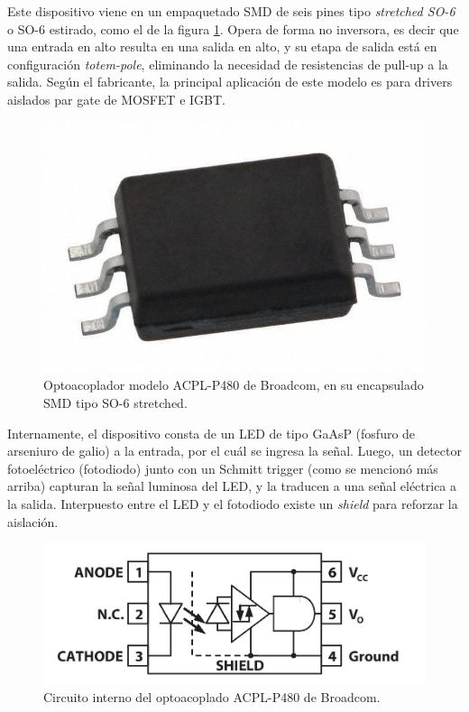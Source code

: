 Este dispositivo viene en un empaquetado SMD de seis pines tipo \textit{stretched SO-6} o SO-6 estirado, como el de la figura \ref{encapsulado_opto}. Opera de forma no inversora, es decir que una entrada en alto resulta en una salida en alto, y su etapa de salida está en configuración \textit{totem-pole}, eliminando la necesidad de resistencias de pull-up a la salida. Según el fabricante, la principal aplicación de este modelo es para drivers aislados par gate de MOSFET e IGBT.\\

\begin{figure}[h]
    \centering
    \includegraphics[scale=0.2]{Imagenes/SO6 Stretched.jpeg}
    \caption{Optoacoplador modelo ACPL-P480 de Broadcom, en su encapsulado SMD tipo SO-6 stretched.}
    \label{encapsulado_opto}
\end{figure}

Internamente, el dispositivo consta de un LED de tipo GaAsP (fosfuro de arseniuro de galio) a la entrada, por el cuál se ingresa la señal. Luego, un detector fotoeléctrico (fotodiodo) junto con un Schmitt trigger (como se mencionó más arriba) capturan la señal luminosa del LED, y la traducen a una señal eléctrica a la salida. Interpuesto entre el LED y el fotodiodo existe un \textit{shield} para reforzar la aislación.\\

\begin{figure}[h]
    \centering
    \includegraphics[scale=0.9]{Imagenes/ACPL-P480.png}
    \caption{Circuito interno del optoacoplado ACPL-P480 de Broadcom.}
    \label{circ_interno_opto}
\end{figure}

